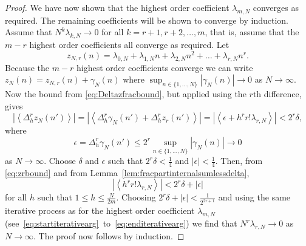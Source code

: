 \documentclass[aap,preprint]{imsart}
\renewcommand{\mid}{\; ; \;}
\newcommand{\fracpart}[1]{\left\langle #1 \right\rangle}
\newcommand{\abs}[1]{\left\vert #1 \right\vert}
\newtheorem{lemma}{Lemma}
\begin{document}
\begin{proof}
We have now shown that the highest order coefficient $\lambda_{m,N}$ converges as required. The remaining coefficients will be shown to converge by induction.  Assume that $N^k \lambda_{k,N} \rightarrow 0$ for all $k=r+1, r+2, \dots, m$, that is, assume that the $m-r$ highest order coefficients all converge as required. Let
\[
z_{N,r}(n) = \lambda_{0,N} + \lambda_{1,N} n + \lambda_{2,N} n^2 + \dots + \lambda_{r,N} n^r.
\]
Because the $m-r$ highest order coefficients converge we can write $z_N(n) = z_{N,r}(n) + \gamma_N(n)$ where $\sup_{n\in\{1,\dots,N\}}\abs{\gamma_N(n)} \rightarrow 0$ as $N\rightarrow\infty$. Now the bound from \eqref{eq:Deltazfracbound}, but applied using the $r$th difference, gives
 \begin{equation}\label{eq:zrbound}
\left|\fracpart{  \Delta_h^r z_N(n')}\right| = \left|\fracpart{  \Delta_h^r\gamma_N(n') + \Delta_h^r z_r(n') }\right| = |\fracpart{ \epsilon + h^r r! \lambda_{r,N} }| < 2^r\delta,
 \end{equation}
 where
\[
\epsilon = \Delta_h^r \gamma_N(n') \leq 2^r \sup_{n\in\{1,\dots,N\}}\abs{\gamma_N(n)} \rightarrow 0
\] 
as $N\rightarrow\infty$.  Choose $\delta$ and $\epsilon$ such that $2^r\delta < \tfrac{1}{4}$ and $|\epsilon| < \tfrac{1}{4}$.  Then, from \eqref{eq:zrbound} and from Lemma~\ref{lem:fracpartinternalsumlessdelta},
\[
\abs{\fracpart{ h^r r! \lambda_{r,N} }} < 2^r\delta + \abs{\epsilon}
\]
for all $h$ such that $1 \leq h \leq \tfrac{N}{2m}$.  Choosing $2^r\delta + |\epsilon| < \frac{1}{2^{2r+1}}$ and using the same iterative process as for the highest order coefficient $\lambda_{m,N}$  (see~\eqref{eq:startiterativearg}~to~\eqref{eq:enditerativearg}) we find that $N^r \lambda_{r,N} \rightarrow 0$ as $N\rightarrow\infty$.  The proof now follows by induction.
 \end{proof}

\end{document}
